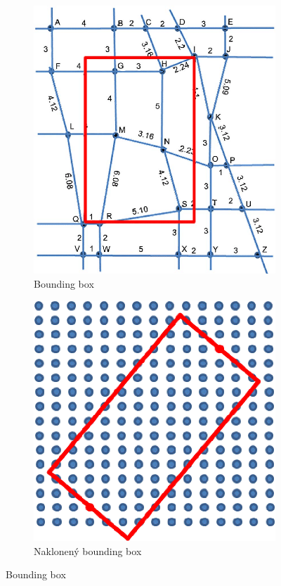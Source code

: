 \begin{figure}[H]
\centering
	\begin{subfigure}[b]{0.48\textwidth}
		\centering
 		\includegraphics[width=0.7\linewidth]{images/bounding-box}
		\caption{Bounding box}
		\label{fig:boundingBoxReal}
	\end{subfigure}
	\begin{subfigure}[b]{0.48\textwidth}
		\centering
		\includegraphics[width=0.7\linewidth]{images/bounding-box-rect}
			\caption{Naklonený bounding box}
		\label{fig:boundingBoxRect}
	\end{subfigure}
	\caption[Bounding box]{Bounding box \cite{bounding-box} \cite{bounding-box-1}}
	\label{fig:boundingBox}
\end{figure}

